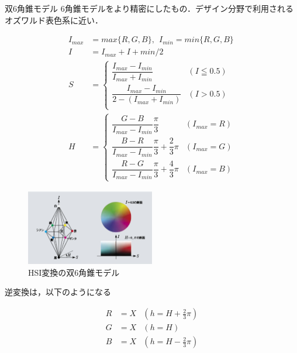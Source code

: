 \documentclass[8pt, jfont=ipaexm, t]{beamer} %
\begin{document}
\begin{frame}[allowframebreaks]{双6角錐モデル}
6角錐モデルをより精密にしたもの．デザイン分野で利用されるオズワルド表色系に近い．

\begin{equation}
\begin{aligned}
I_{max} &= max\{R, G, B\}, ~~ I_{min} = min\{R, G, B\} \\
I &= I_{max} + I+{min} / 2 \\
S &= 
\begin{cases}
\dfrac{I_{max} - I_{min}}{I_{max} + I_{min}} &(I \leqq 0.5)\\[3mm] 
\dfrac{I_{max} - I_{min}}{2 - (I_{max} + I_{min})} &(I >0.5)\\
\end{cases}
\\
H &= 
\begin{cases}
\dfrac{G - B}{I_{max} - I_{min}}\dfrac{\pi}{3} & (I_{max} = R) \\[3mm]
\dfrac{B - R}{I_{max} - I_{min}}\dfrac{\pi}{3} + \dfrac{2}{3}\pi & (I_{max} = G) \\[3mm]
\dfrac{R - G}{I_{max} - I_{min}}\dfrac{\pi}{3} + \dfrac{4}{3}\pi & (I_{max} = B)
\end{cases}
\end{aligned}
\end{equation}

\newpage

\begin{figure}[b]
  \centering
  \includegraphics[width=0.5\textwidth]{./figure/027.png}
  \caption{HSI変換の双6角錐モデル}
  \label{fig:hsi2}
\end{figure}


逆変換は，以下のようになる

\begin{equation}
\begin{aligned}
R &= X & (h = H + \frac{2}{3}\pi) \\
G &= X & (h = H) \\
B &= X & (h = H - \frac{2}{3}\pi)
\end{aligned}
\end{equation}



\end{frame}
\end{document}
